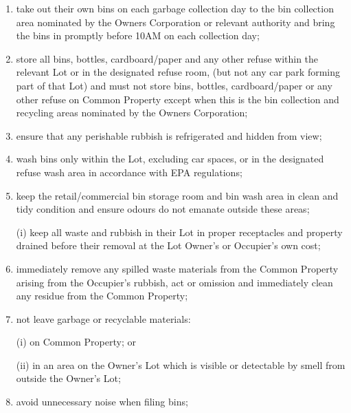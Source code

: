 \documentclass{article}
\begin{document}
\begin{enumerate}[label=\arabic*.]
\begin{enumerate}[label=\arabic{enumi}.\arabic*.]
\begin{enumerate}[label=\arabic{enumi}.\arabic*.]
\begin{enumerate}[label=(\arabic*)]
\begin{enumerate}[label=(\alph*)]
(i) ensure that any contractors hired for the purpose of removing garbage, must pick up the garbage between:

(ii) 7AM and 9AM, if any rubbish is being picked up on Monday to Saturday; and

(iii) Between 9AM and 10AM, if any rubbish is being picked up on Sunday.

\item  take out their own bins on each garbage collection day to the bin collection area nominated by the Owners Corporation or relevant authority and bring the bins in promptly before 10AM on each collection day;

\item  store all bins, bottles, cardboard/paper and any other refuse within the relevant Lot or in the designated refuse room, (but not any car park forming part of that Lot) and must not store bins, bottles, cardboard/paper or any other refuse on Common Property except when this is the bin collection and recycling areas nominated by the Owners Corporation;

\item  ensure that any perishable rubbish is refrigerated and hidden from view;

\item  wash bins only within the Lot, excluding car spaces, or in the designated refuse wash area in accordance with EPA regulations;

\item  keep the retail/commercial bin storage room and bin wash area in clean and tidy condition and ensure odours do not emanate outside these areas;

(i) keep all waste and rubbish in their Lot in proper receptacles and property drained before their removal at the Lot Owner’s or Occupier’s own cost;

\item  immediately remove any spilled waste materials from the Common Property arising from the Occupier’s rubbish, act or omission and immediately clean any residue from the Common Property;

\item  not leave garbage or recyclable materials:

(i) on Common Property; or

(ii) in an area on the Owner’s Lot which is visible or detectable by smell from outside the Owner’s Lot;

\item  avoid unnecessary noise when filing bins;


\end{enumerate}
\end{enumerate}
\end{enumerate}
\end{enumerate}
\end{enumerate}
\end{document}
